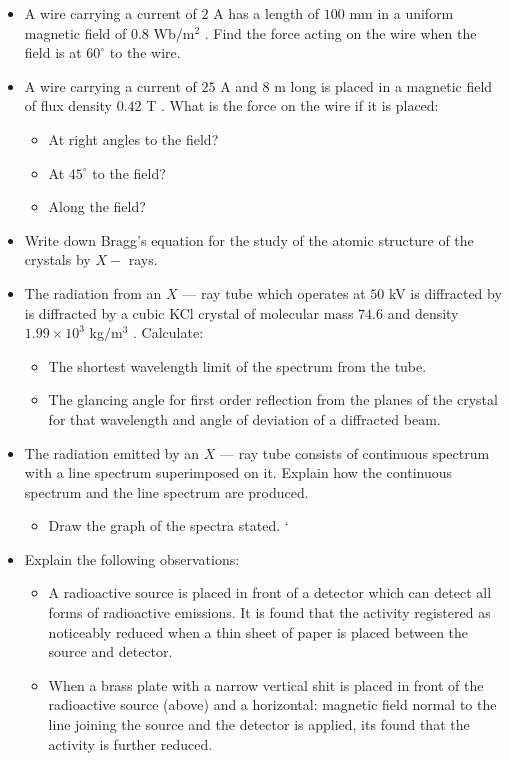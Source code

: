 \documentclass{article}
\begin{document}
\begin{itemize}
\item A wire carrying a current of $ 2$ A has a length of $ 100$ mm in a uniform magnetic field of $ 0.8$ Wb$/$m$ ^{2}$ .  Find the force acting on the wire when the field is at $ 60^{\circ}$ to the wire.
\item A wire carrying a current of $ 25$ A and $ 8$ m long is placed in a magnetic field of flux density $ 0.42$ T . What is the force on the wire if it is placed:
 \begin{itemize}
\item At right angles to the field?
\item At $ 45^{\circ}$ to the field?
\item Along the field?
\end{itemize}
\item Write down Bragg’s equation for the study of the atomic structure of the crystals by $ X-$ rays.
\item The radiation from an $ X$ — ray tube which operates at $ 50$ kV is diffracted by is diffracted by a cubic KCl crystal of molecular mass $ 74.6$ and density $ 1.99 \times 10^{3}$ kg$/$m$ ^{3}$ .  Calculate:
 \begin{itemize}
\item The shortest wavelength limit of the spectrum from the tube.
\item The glancing angle for first order reflection from the planes of the crystal for that wavelength and angle of deviation of a diffracted beam.
\end{itemize}
\item The radiation emitted by an $ X$ — ray tube consists of continuous spectrum with a line spectrum superimposed on it. Explain how the continuous spectrum and the line spectrum are produced.
 \begin{itemize}
\item Draw the graph of the spectra stated. ‘
\end{itemize}
\item Explain the following observations:
 \begin{itemize}
\item A radioactive source is placed in front of a detector which can detect all forms of radioactive emissions. It is found that the activity registered as noticeably reduced when a thin sheet of paper is placed between the source and detector.
\item When a brass plate with a narrow vertical shit is placed in front of the radioactive source (above) and a horizontal: magnetic field normal to the line joining the source and the detector is applied, its found that the activity is further reduced.

\end{itemize}
\end{itemize}
\end{document}
